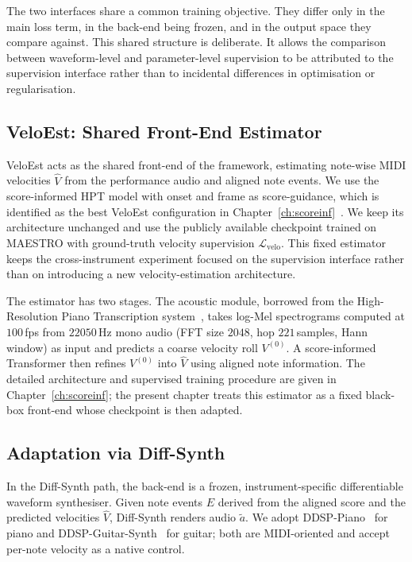 The two interfaces share a common training objective. They differ only in the main loss term, in the back-end being frozen, and in the output space they compare against. This shared structure is deliberate. It allows the comparison between waveform-level and parameter-level supervision to be attributed to the supervision interface rather than to incidental differences in optimisation or regularisation.

\subsection{VeloEst: Shared Front-End Estimator}
\label{ssec:bp:veloest}

VeloEst acts as the shared front-end of the framework, estimating note-wise MIDI velocities $\hat{V}$ from the performance audio and aligned note events. We use the score-informed HPT model with onset and frame as score-guidance, which is identified as the best VeloEst configuration in Chapter~\ref{ch:scoreinf}~\cite{he2026score}. We keep its architecture unchanged and use the publicly available checkpoint trained on MAESTRO with ground-truth velocity supervision $\mathcal{L}_{\mathrm{velo}}$. This fixed estimator keeps the cross-instrument experiment focused on the supervision interface rather than on introducing a new velocity-estimation architecture.

The estimator has two stages. The acoustic module, borrowed from the High-Resolution Piano Transcription system~\cite{kong2021hpt}, takes log-Mel spectrograms computed at $100$\,fps from $22050$\,Hz mono audio (FFT size $2048$, hop $221$\,samples, Hann window) as input and predicts a coarse velocity roll $V^{(0)}$. A score-informed Transformer then refines $V^{(0)}$ into $\hat{V}$ using aligned note information. The detailed architecture and supervised training procedure are given in Chapter~\ref{ch:scoreinf}; the present chapter treats this estimator as a fixed black-box front-end whose checkpoint is then adapted.

\subsection{Adaptation via Diff-Synth}
\label{ssec:bp:adapt_diffsynth}

In the Diff-Synth path, the back-end is a frozen, instrument-specific differentiable waveform synthesiser. Given note events $E$ derived from the aligned score and the predicted velocities $\hat{V}$, Diff-Synth renders audio $\tilde{a}$. We adopt DDSP-Piano~\cite{renault2023ddsp_piano} for piano and DDSP-Guitar-Synth~\cite{jonason2024guitar} for guitar; both are MIDI-oriented and accept per-note velocity as a native control.

